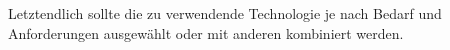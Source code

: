 \documentclass[runningheads,a4paper]{llncs}
\begin{document}
Letztendlich sollte die zu verwendende Technologie je nach Bedarf und Anforderungen ausgewählt oder mit anderen kombiniert werden.




\clearpage

{}


\end{document}

